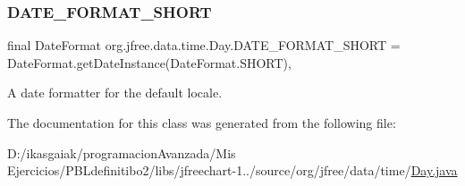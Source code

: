 \subsubsection{\texorpdfstring{D\+A\+T\+E\+\_\+\+F\+O\+R\+M\+A\+T\+\_\+\+S\+H\+O\+RT}{DATE\_FORMAT\_SHORT}}
{\footnotesize\ttfamily final Date\+Format org.\+jfree.\+data.\+time.\+Day.\+D\+A\+T\+E\+\_\+\+F\+O\+R\+M\+A\+T\+\_\+\+S\+H\+O\+RT = Date\+Format.\+get\+Date\+Instance(Date\+Format.\+S\+H\+O\+RT)\hspace{0.3cm}{\ttfamily [static]}, {\ttfamily [protected]}}

A date formatter for the default locale. 

The documentation for this class was generated from the following file\+:\begin{DoxyCompactItemize}
\item 
D\+:/ikasgaiak/programacion\+Avanzada/\+Mis Ejercicios/\+P\+B\+Ldefinitibo2/libs/jfreechart-\/1../source/org/jfree/data/time/\mbox{\hyperlink{_day_8java}{Day.\+java}}\end{DoxyCompactItemize}

